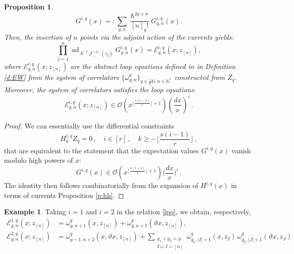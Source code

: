 \documentclass[reqno,11pt]{amsart}
\theoremstyle{plain}
\newtheorem{proposition}[theorem]{Proposition}
\theoremstyle{definition}
\newtheorem{example}[theorem]{Example}
\theoremstyle{remark}
\numberwithin{equation}{section}
\renewcommand{\theta}{\vartheta}
\newcommand{\mc}[1]{\mathcal{#1}}
\newcommand{\1}{\mathds{1}}
\newcommand{\2}{\frac{1}{2}}
\DeclareMathOperator{\ad}{ad}
\begin{document}
{\begin{proposition}
									\begin{equation}
										G^{i,q}(x) =: \sum_{g,n} \frac{\hslash^{2g+n}}{[n]_q!} G^{i,q}_{g,n}(x).
									\end{equation}
									Then, the insertion of $n$ points via the adjoint action of the currents yields:
									\begin{equation}
										\prod_{j=1}^n \ad_{\hslash^{-1}\mc{J}^{(q)}_-(z_j)} G^{i,q}_{g,n}(x) = \mathcal{E}^{i,q}_{g,n}(x; z_{[n]}),
									\end{equation}
									where $ \mathcal{E}^{i,q}_{g,n}(x; z_{[n]})$ are the abstract loop equations defined in in Definition \ref{d:EW} from the system of correlators $\{\omega^{q}_{g,n} \}_{g \in \frac{1}{2}\mathbb{N}, n \in \mathbb{N}^*}$ constructed from $Z_q$. Moreover, the system of correlators satisfies the loop equations:
									\begin{equation}\label{lpq}
										\mathcal{E}^{i,q}_{g,n} (x; z_{[n]}) \in \mathcal{O} \left( x^{ \lfloor \frac{s(i-1)}{r}\rfloor + 1} \right) \left( \frac{dx}{x}\right)^i \,.
									\end{equation}
								\end{proposition}
								\begin{proof} 
									We can essentially use the differential constraints 
									\begin{equation}
										H^{i,q}_k Z_q = 0 \,, \quad i \in [r]\,, \quad k \geq - \lfloor \frac{s(i-1)}{r} \rfloor\,,
									\end{equation}
									that are equivalent to the statement that the expectation values $G^{i,q}(x)$ vanish modulo high powers of $x$:
									\begin{equation}
										G^{i,q}(x)  \in \mc{O} \left( x^{\lfloor \frac{s(i-1)}{r}\rfloor + 1} \right) \Big( \frac{dx}{x}\Big)^i \,.
									\end{equation}
									The identity then follows combinatorially from the expansion of $H^{i,q}(x)$ in terms of currents
									Proposition \ref{p:hh}.
								\end{proof}
								{\begin{example}
										Taking $i=1$ and $i=2$ in the relation \eqref{lpq}, we obtain, respectively, 
										\begin{align}
											\mathcal{E}^{1,q}_{g,n}(x; z_{[n]}) &= \omega^q_{g,n+1}(x, z_{[n]}) + \omega^q_{g,n+1}(\theta x, z_{[n]}),\nonumber\\
											\mathcal{E}^{2,q}_{g,n}(x; z_{[n]})& = \omega^q_{g-1, n+2}(x, \theta x, z_{[n]}) + \sum_{\substack{g_1+g_2=g \\ I \sqcup J = {[n]}}} \omega^q_{g_1, |I|+1}(x, z_I) \, \omega^q_{g_2, |J|+1}(\theta x, z_J)

\end{align}
\end{example}}}
\end{document}
